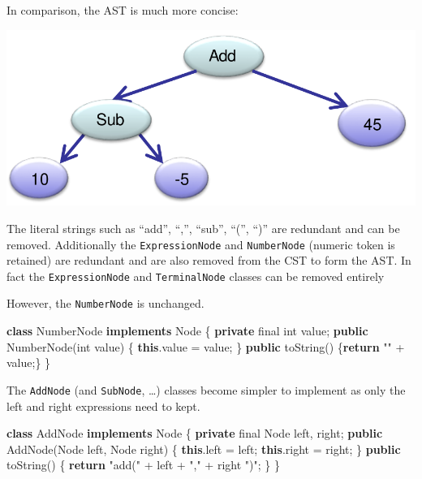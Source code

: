 \documentclass[
]{book}
\newenvironment{Shaded}{\begin{snugshade}}{\end{snugshade}}
\newcommand{\BuiltInTok}[1]{#1}
\newcommand{\DataTypeTok}[1]{\textcolor[rgb]{0.13,0.29,0.53}{#1}}
\newcommand{\FunctionTok}[1]{\textcolor[rgb]{0.00,0.00,0.00}{#1}}
\newcommand{\KeywordTok}[1]{\textcolor[rgb]{0.13,0.29,0.53}{\textbf{#1}}}
\newcommand{\NormalTok}[1]{#1}
\newcommand{\StringTok}[1]{\textcolor[rgb]{0.31,0.60,0.02}{#1}}
\begin{document}
In comparison, the AST is much more concise:

\includegraphics{img/09-image09.png}

The literal strings such as ``add'', ``,'', ``sub'', ``('', ``)'' are redundant and can be removed. Additionally the \texttt{ExpressionNode} and \texttt{NumberNode} (numeric token is retained) are redundant and are also removed from the CST to form the AST. In fact the \texttt{ExpressionNode} and \texttt{TerminalNode} classes can be removed entirely

However, the \texttt{NumberNode} is unchanged.

\begin{Shaded}
\begin{Highlighting}[]
\KeywordTok{class}\NormalTok{ NumberNode }\KeywordTok{implements} \BuiltInTok{Node}\NormalTok{ \{}
  \KeywordTok{private} \DataTypeTok{final} \DataTypeTok{int}\NormalTok{ value;}
  \KeywordTok{public} \FunctionTok{NumberNode}\NormalTok{(}\DataTypeTok{int}\NormalTok{ value) \{}
    \KeywordTok{this}\NormalTok{.}\FunctionTok{value}\NormalTok{ = value;}
\NormalTok{  \}}
  \KeywordTok{public} \FunctionTok{toString}\NormalTok{() \{}\KeywordTok{return} \StringTok{""}\NormalTok{ + value;\}}
\NormalTok{\}}
\end{Highlighting}
\end{Shaded}

The \texttt{AddNode} (and \texttt{SubNode}, \ldots) classes become simpler to implement as only the left and right expressions need to kept.

\begin{Shaded}
\begin{Highlighting}[]
\KeywordTok{class}\NormalTok{ AddNode }\KeywordTok{implements} \BuiltInTok{Node}\NormalTok{ \{}
  \KeywordTok{private} \DataTypeTok{final} \BuiltInTok{Node}\NormalTok{ left, right;}
  \KeywordTok{public} \FunctionTok{AddNode}\NormalTok{(}\BuiltInTok{Node}\NormalTok{ left, }\BuiltInTok{Node}\NormalTok{ right) \{}
    \KeywordTok{this}\NormalTok{.}\FunctionTok{left}\NormalTok{ = left;}
    \KeywordTok{this}\NormalTok{.}\FunctionTok{right}\NormalTok{ = right;}
\NormalTok{  \}}
  \KeywordTok{public} \FunctionTok{toString}\NormalTok{() \{}
    \KeywordTok{return} \StringTok{"add("}\NormalTok{ + left + }\StringTok{","}\NormalTok{ + right }\StringTok{")"}\NormalTok{;}
\NormalTok{  \}}
\NormalTok{\}}
\end{Highlighting}
\end{Shaded}
\end{document}
